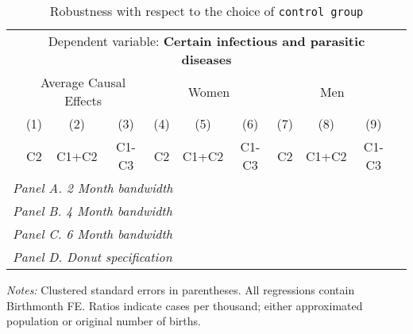  \begin{table}[H] \begin{threeparttable} \centering \caption{Robustness with respect to the choice of \texttt{control group}} {\def\sym#1{\ifmmode^{#1}\else\(^{#1}\)\fi} \begin{tabular}{l*{10}{c}} \toprule & \multicolumn{9}{c}{Dependent variable: \textbf{Certain infectious and parasitic diseases}} \\ \cmidrule(lr){2-10}
            &\multicolumn{3}{c}{Average Causal Effects}&\multicolumn{3}{c}{Women}             &\multicolumn{3}{c}{Men}               \\\cmidrule(lr){2-4}\cmidrule(lr){5-7}\cmidrule(lr){8-10}
            &\multicolumn{1}{c}{(1)}&\multicolumn{1}{c}{(2)}&\multicolumn{1}{c}{(3)}&\multicolumn{1}{c}{(4)}&\multicolumn{1}{c}{(5)}&\multicolumn{1}{c}{(6)}&\multicolumn{1}{c}{(7)}&\multicolumn{1}{c}{(8)}&\multicolumn{1}{c}{(9)}\\
            &\multicolumn{1}{c}{C2}&\multicolumn{1}{c}{C1+C2}&\multicolumn{1}{c}{C1-C3}&\multicolumn{1}{c}{C2}&\multicolumn{1}{c}{C1+C2}&\multicolumn{1}{c}{C1-C3}&\multicolumn{1}{c}{C2}&\multicolumn{1}{c}{C1+C2}&\multicolumn{1}{c}{C1-C3}\\
\midrule
 \multicolumn{10}{l}{\emph{Panel A. 2 Month bandwidth}} \\    \midrule\multicolumn{10}{l}{\emph{Panel B. 4 Month bandwidth}} \\    \midrule\multicolumn{10}{l}{\emph{Panel C. 6 Month bandwidth}} \\    \midrule\multicolumn{10}{l}{\emph{Panel D. Donut specification}} \\    
\bottomrule \end{tabular} } \begin{tablenotes} \item \scriptsize \emph{Notes:} Clustered standard errors in parentheses. All regressions contain Birthmonth FE. Ratios indicate cases per thousand; either approximated population or original number of births. \end{tablenotes} \end{threeparttable} \end{table} 
